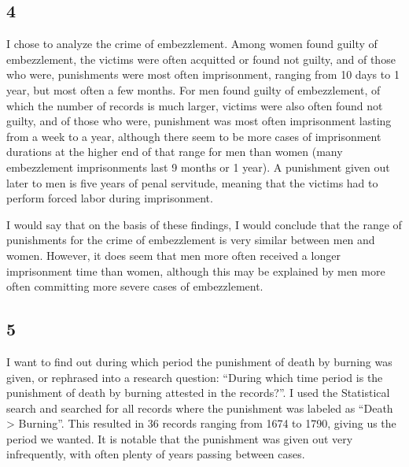 \documentclass{article}
\begin{document}
\subsection{4}
I chose to analyze the crime of embezzlement. Among women found guilty of embezzlement, the victims were often acquitted or found not guilty, and of those who were, punishments were most often imprisonment, ranging from 10 days to 1 year, but most often a few months. For men found guilty of embezzlement, of which the number of records is much larger, victims were also often found not guilty, and of those who were, punishment was most often imprisonment lasting from a week to a year, although there seem to be more cases of imprisonment durations at the higher end of that range for men than women (many embezzlement imprisonments last 9 months or 1 year). A punishment given out later to men is five years of penal servitude, meaning that the victims had to perform forced labor during imprisonment.

I would say that on the basis of these findings, I would conclude that the range of punishments for the crime of embezzlement is very similar between men and women. However, it does seem that men more often received a longer imprisonment time than women, although this may be explained by men more often committing more severe cases of embezzlement.

\subsection{5}
I want to find out during which period the punishment of death by burning was given, or rephrased into a research question: ``During which time period is the punishment of death by burning attested in the records?''. I used the Statistical search and searched for all records where the punishment was labeled as ``Death > Burning''. This resulted in 36 records ranging from 1674 to 1790, giving us the period we wanted. It is notable that the punishment was given out very infrequently, with often plenty of years passing between cases.
\end{document}
